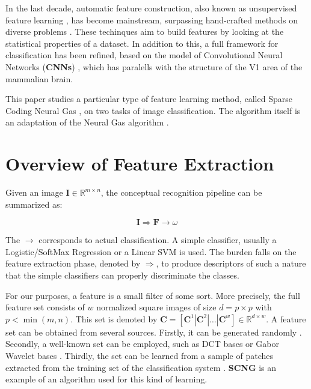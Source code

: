 \documentclass[runningheads,a4paper]{llncs}
\newcommand{\hctimes}[2]{{#1}\!\times\!{#2}}
\begin{document}
In the last decade, automatic feature construction, also known as unsupervised feature learning \cite{best-architecture-object-recognition,emergence-sparse-coding,sparse-coding-strategy-V1,tiny-images}, has become mainstream, surpassing hand-crafted methods on diverse problems \cite{best-architecture-object-recognition,learning-convolutional-feature-hierarchies,gradient-based-learning,convolutional-networks-vision,best-practices-cnn,simple-method-sparse-coding,sparse-features-audio-classification}. These techinques aim to build features by looking at the statistical properties of a dataset. In addition to this, a full framework for classification has been refined, based on the model of Convolutional Neural Networks (\textbf{CNNs}) \cite{gradient-based-learning}, which has paralells with the structure of the V1 area of the mammalian brain.

This paper studies a particular type of feature learning method, called Sparse Coding Neural Gas \cite{sparse-coding-neural-gas-1,sparse-coding-neural-gas-2,sparse-coding-neural-gas-3,sparse-coding-neural-gas-4}, on two tasks of image classification. The algorithm itself is an adaptation of the Neural Gas algorithm \cite{neural-gas-1,neural-gas-2}.

\section{Overview of Feature Extraction}

Given an image $\textbf{I} \in \mathbb{R}^{\hctimes{m}{n}}$, the conceptual recognition pipeline can be summarized as:

\begin{equation}
\textbf{I} \Rightarrow \textbf{F} \rightarrow \omega
\end{equation}

The $\rightarrow$ corresponds to actual classification. A simple classifier, usually a Logistic/SoftMax Regression or a Linear SVM is used. The burden falls on the feature extraction phase, denoted by $\Rightarrow$, to produce descriptors of such a nature that the simple classifiers can properly discriminate the classes.

For our purposes, a feature is a small filter of some sort. More precisely, the full feature set consists of $w$ normalized square images of size $d = \hctimes{p}{p}$ with $p < \min(m,n)$. This set is denoted by $\textbf{C} = \left[ \textbf{C}^1 \left|\right. \textbf{C}^2 \left|\right. \dots \left|\right. \textbf{C}^w \right] \in \mathbb{R}^{\hctimes{d}{w}}$. A feature set can be obtained from several sources. Firstly, it can be generated randomly \cite{random-weights-feature-learning}. Secondly, a well-known set can be employed, such as DCT bases or Gabor Wavelet bases \cite{simple-method-sparse-coding}. Thirdly, the set can be learned from a sample of patches extracted from the training set of the classification system \cite{emergence-sparse-coding,sparse-coding-strategy-V1,tiny-images}. \textbf{SCNG} is an example of an algorithm used for this kind of learning.
\end{document}
